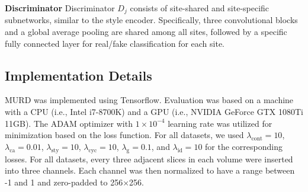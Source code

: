 \documentclass{nature}
\begin{document}
\begin{methods}
\textbf{Discriminator} Discriminator $D_j$ consists of site-shared and site-specific subnetworks, similar to the style encoder. 
Specifically, three convolutional blocks and a global average pooling are shared among all sites, followed by a specific fully connected layer for real/fake classification for each site. 

\subsection{Implementation Details} 
MURD was implemented using Tensorflow. Evaluation was based on a machine with a CPU (i.e., Intel i7-8700K) and a GPU (i.e., NVIDIA GeForce GTX 1080Ti 11GB). The ADAM optimizer with $1\times10^{-4}$ learning rate was utilized for minimization based on the loss function. For all datasets, we used $\lambda_\text{cont}=10$, $\lambda_\text{ca}=0.01$, $\lambda_\text{sty}=10$, $\lambda_\text{cyc}=10$, $\lambda_\text{g}=0.1$, and $\lambda_\text{id}=10$ for the corresponding losses.
For all datasets, every three adjacent slices in each volume were inserted into three channels. Each channel
was then normalized to have a range between -1 and 1 and zero-padded to 256$\times$256.



\end{methods}
\end{document}
